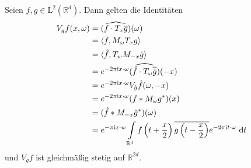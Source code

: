 \begin{sz}\label{fundamental_identities_STFT}
	Seien $f,g \in \mathrm{L}^2(\mathbb{R}^{d})$.
	Dann gelten die Identitäten
	\begin{align}
	V_g f(x,\omega)
	&=
	\widehat{(f \cdot T_x \overline{g})} (\omega)\label{eq:identity_STFT_1}\\
	&=
	\langle f, M_\omega T_x g \rangle\label{eq:identity_STFT_2}\\
	&=
	\langle \hat{f} , T_w M_{-x} \hat g \rangle\label{eq:identity_STFT_3}\\
	&=
	e^{-2 \pi \mathrm{i} x \cdot \omega} \widehat{(\hat{f} \cdot T_\omega \overline{ \hat{g} })} (-x)\label{eq:identity_STFT_4}\\
	&=
	e^{-2\pi \mathrm{i} x \cdot \omega} V_{\hat{g}} \hat{f}(\omega,-x)\label{eq:identity_STFT_5}\\
	&=
	e^{-2\pi \mathrm{i} x \cdot \omega}  (f \ast M_\omega g^\ast)(x) \label{eq:identity_STFT_7}\\
	&=
	(\hat{f} \ast M_{-x} \hat{g}^\ast)(\omega)\label{eq:identity_STFT_8}\\
	&=
	e^{-\pi \mathrm{i} x \cdot w } \int \limits_{\mathbb{R}^d} f\left( t + \frac{x}{2} \right) \overline{g\left( t - \frac{x}{2} \right)} e^{-2 \pi \mathrm{i} t \cdot \omega} \text{ d} t\label{eq:identity_STFT_9}
	\end{align}
	und $V_g f$ ist gleichmäßig stetig auf $\mathbb{R}^{2d}$.
\end{sz}

